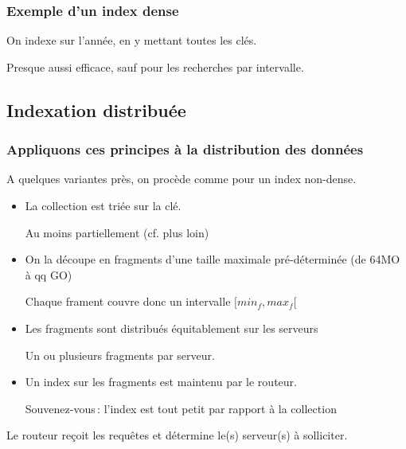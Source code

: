 \begin{frame}
\frametitle{Exemple d'un index dense}

On indexe sur l'année, en y mettant \alert{toutes} les clés.


Presque aussi efficace, sauf pour les recherches par intervalle.
\end{frame}

\subsection{Indexation distribuée}


\begin{frame}
\frametitle{Appliquons ces principes à la distribution des données}

A quelques variantes près, on procède comme pour un index non-dense.

\begin{itemize}
  \item La collection est triée sur la clé.
   
        \smallskip
   
       Au moins partiellement (cf. plus loin)
       
  \item On la découpe en fragments d'une taille maximale pré-déterminée (de 64MO à qq GO)
   
   \smallskip
   
        Chaque frament couvre donc un intervalle $[min_f, max_f[$
        
   \item Les fragments sont distribués équitablement sur les serveurs

    \smallskip
    
         Un ou plusieurs fragments par serveur.

   \item Un index sur les fragments est maintenu par le routeur.
 
    \smallskip
   
      \alert{Souvenez-vous\,: l'index est tout petit par rapport à la collection}
      
\end{itemize} 

\alert{Le routeur reçoit les requêtes et détermine le(s) serveur(s) à solliciter.}

\end{frame}

